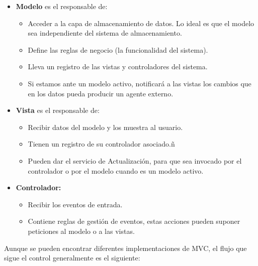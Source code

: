 \begin{itemize} 

\item \textbf{Modelo} es el responsable de:

\begin{itemize}
 \item Acceder a la capa de almacenamiento de datos. Lo ideal es que el modelo sea independiente del sistema de almacenamiento.
 \item Define las reglas de negocio (la funcionalidad del sistema).
 \item Lleva un registro de las vistas y controladores del sistema.
 \item Si estamos ante un modelo activo, notificará a las vistas los cambios que en los datos pueda producir un agente externo.
\end{itemize}

\item \textbf{Vista} es el responsable de:

\begin{itemize}
 \item Recibir datos del modelo y los muestra al usuario.
 \item Tienen un registro de su controlador asociado.ñ
 \item Pueden dar el servicio de Actualización, para que sea invocado por el controlador o por el modelo cuando es un modelo activo.\\
\end{itemize}


\item \textbf{Controlador:}

\begin{itemize}
 \item Recibir los eventos de entrada.
 \item Contiene reglas de gestión de eventos, estas acciones pueden suponer peticiones al modelo o a las vistas.\\
\end{itemize}

\end{itemize}

Aunque se pueden encontrar diferentes implementaciones de MVC, el flujo que sigue el control generalmente es el siguiente:

